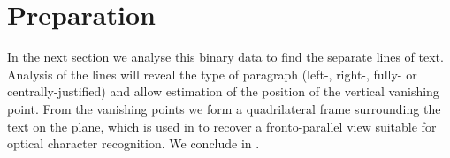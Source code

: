 \section{Preparation}
\label{prepandprobdef}




In the next section we analyse this binary data to find the separate
lines of text.
Analysis of the lines will reveal the type of paragraph (left-, right-, fully-
or centrally-justified) and allow estimation of the position of
the vertical vanishing point.
From the vanishing points we form a quadrilateral frame surrounding the
text on the plane, which is used in
 to recover a
fronto-parallel view suitable for optical character recognition.
We conclude in .